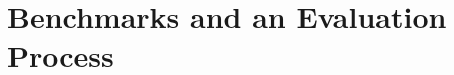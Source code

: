 \documentclass[letterpaper]{article} %
\newcommand{\realm}{{\ensuremath{M^*}}\xspace}
\newif\ifaddcomments
\newcommand{\roni}[1]{\ifaddcomments{\textcolor{red}{[Roni: #1]}}\fi}
\newcommand{\gregor}[1]{\ifaddcomments{\textcolor{orange}{[Gregor: #1]}}\fi}
\newcommand{\cm}[1]{\ifaddcomments{\textcolor{olive}{[Christian: #1]}}\fi}
\begin{document}







\section{Benchmarks and an Evaluation Process}
\end{document}
